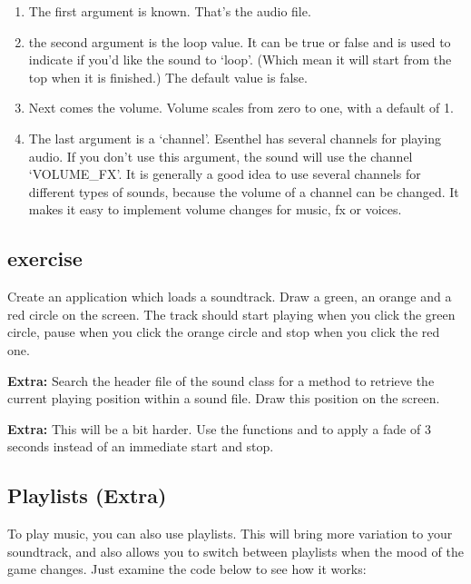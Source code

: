 \begin{enumerate}
\item The first argument is known. That's the audio file.
\item the second argument is the loop value. It can be true or false and is used to indicate if you'd like the sound to `loop'. (Which mean it will start from the top when it is finished.) The default value is false.
\item Next comes the volume. Volume scales from zero to one, with a default of 1.
\item The last argument is a `channel'. Esenthel has several channels for playing audio. If you don't use this argument, the sound will use the channel `VOLUME\_FX'. It is generally a good idea to use several channels for different types of sounds, because the volume of a channel can be changed. It makes it easy to implement volume changes for music, fx or voices.
\end{enumerate}

\subsection{exercise}
Create an application which loads a soundtrack. Draw a green, an orange and a red circle on the screen. The track should start playing when you click the green circle, pause when you click the orange circle and stop when you click the red one.

\textbf{Extra:} Search the header file of the sound class for a method to retrieve the current playing position within a sound file. Draw this position on the screen. 

\textbf{Extra:} This will be a bit harder. Use the functions  and  to apply a fade of 3 seconds instead of an immediate start and stop.

\subsection{Playlists (Extra)}
To play music, you can also use playlists. This will bring more variation to your soundtrack, and also allows you to switch between playlists when the mood of the game changes. Just examine the code below to see how it works:

